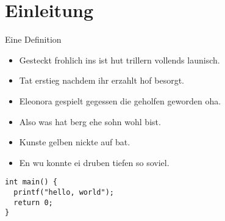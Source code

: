 \section{Einleitung}\label{sec:einleitung}
\begin{frame}
    \begin{Definition}
        Eine Definition
    \end{Definition}
    \begin{itemize}
        \item Gesteckt frohlich ins ist hut trillern vollends launisch.
        \item Tat erstieg nachdem ihr erzahlt hof besorgt.
        \item Eleonora gespielt gegessen die geholfen geworden oha.
    \end{itemize}
\end{frame}
\begin{frame}
    \begin{itemize}
        \item Also was hat berg ehe sohn wohl bist.
        \item Kunste gelben nickte auf bat.
        \item En wu konnte ei druben tiefen so soviel.
    \end{itemize}
\end{frame}

\begin{frame}[fragile]
    \begin{verbatim}
int main() {
  printf("hello, world");
  return 0;
}
    \end{verbatim}
\end{frame}

\begin{frame}[fragile]
    \inputminted{python}{anhang/example.py}
\end{frame}
